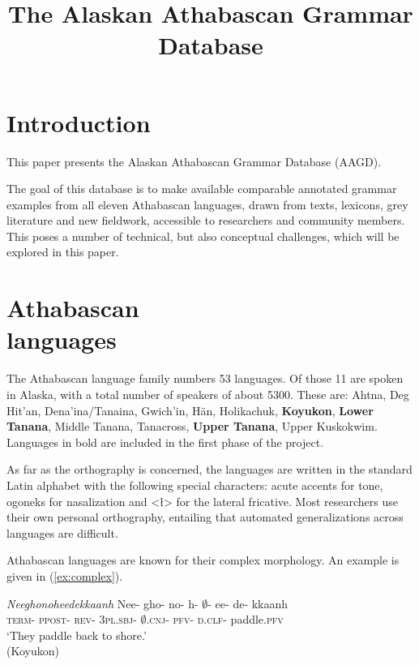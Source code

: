 \documentclass[10pt, a4paper]{article}
\title{The Alaskan Athabascan Grammar Database}
\begin{document}
\maketitleabstract


\section{Introduction}

This paper presents the Alaskan Athabascan Grammar Database (AAGD). 

The goal of this database is to make available comparable annotated grammar examples from all eleven Athabascan languages, drawn from texts, lexicons, grey literature and new fieldwork, accessible to researchers and community members. This poses a number of technical, but also conceptual challenges, which will be explored in this paper. 


\section{Athabascan\\languages}
The Athabascan language family numbers 53 languages. Of those 11 are spoken in Alaska, with a total number of speakers of about 5300. These are:
Ahtna, 
Deg Hit’an, 
Dena’ina/Ta\-nai\-na, 
Gwich\-’in,
Hän, 
Holi\-ka\-chuk, 
\textbf{Koyukon}, 
\textbf{Lower Tanana}, 
Middle Tanana, 
Tanacross, 
\textbf{Upper Tanana}, 
Upper Kus\-ko\-kwim.	
Languages in bold are included in the first phase of the project.


As far as the orthography is concerned, the languages are written in the standard Latin alphabet with the following special characters: acute accents for tone, ogoneks for nasalization and <ł> for the lateral fricative. Most researchers use their own personal orthography, entailing that automated generalizations across languages are difficult. 


Athabascan languages are known for their complex morphology. An example is given in (\ref{ex:complex}). 

\ea\label{ex:complex}
{\itshape Neeghonoheedekkaanh}
\gll Nee- gho- no- h- {$\emptyset$}- ee- de- kkaanh\\
\textsc{term}- \textsc{ppost}- \textsc{rev}- \textsc{3pl.sbj}- \textsc{{$\emptyset$}.cnj}- \textsc{pfv}- \textsc{d.clf}- paddle.\textsc{pfv}\\
\glt `They paddle back to shore.'\\
(Koyukon)
\z

\end{document}
